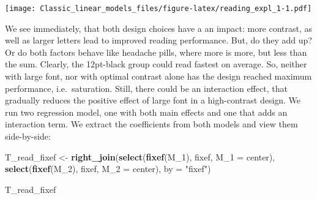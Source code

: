 \documentclass[]{svmono}
\newenvironment{Shaded}{\begin{snugshade}}{\end{snugshade}}
\newcommand{\KeywordTok}[1]{\textcolor[rgb]{0.13,0.29,0.53}{\textbf{#1}}}
\newcommand{\DataTypeTok}[1]{\textcolor[rgb]{0.13,0.29,0.53}{#1}}
\newcommand{\DecValTok}[1]{\textcolor[rgb]{0.00,0.00,0.81}{#1}}
\newcommand{\StringTok}[1]{\textcolor[rgb]{0.31,0.60,0.02}{#1}}
\newcommand{\OperatorTok}[1]{\textcolor[rgb]{0.81,0.36,0.00}{\textbf{#1}}}
\newcommand{\NormalTok}[1]{#1}
\theoremstyle{definition}
\theoremstyle{definition}
\theoremstyle{definition}
\theoremstyle{remark}
\begin{document}
\texttt{[image: Classic\_linear\_models\_files/figure-latex/reading\_expl\_1-1.pdf]}

We see immediately, that both design choices have a an impact: more
contrast, as well as larger letters lead to improved reading
performance. But, do they add up? Or do both factors behave like
headache pills, where more is more, but less than the sum. Clearly, the
12pt-black group could read fastest on average. So, neither with large
font, nor with optimal contrast alone has the design reached maximum
performance, i.e.~saturation. Still, there could be an interaction
effect, that gradually reduces the positive effect of large font in a
high-contrast design. We run two regression model, one with both main
effects and one that adds an interaction term. We extract the
coefficients from both models and view them side-by-side:

\begin{Shaded}
\end{Shaded}

\begin{Shaded}
\begin{Highlighting}[]
\NormalTok{T_read_fixef <-}
\StringTok{  }\KeywordTok{right_join}\NormalTok{(}\KeywordTok{select}\NormalTok{(}\KeywordTok{fixef}\NormalTok{(M_}\DecValTok{1}\NormalTok{), fixef, }\DataTypeTok{M_1 =}\NormalTok{ center),}
             \KeywordTok{select}\NormalTok{(}\KeywordTok{fixef}\NormalTok{(M_}\DecValTok{2}\NormalTok{), fixef, }\DataTypeTok{M_2 =}\NormalTok{ center),}
             \DataTypeTok{by =} \StringTok{"fixef"}\NormalTok{)}

\NormalTok{T_read_fixef}
\end{Highlighting}
\end{Shaded}
\end{document}
